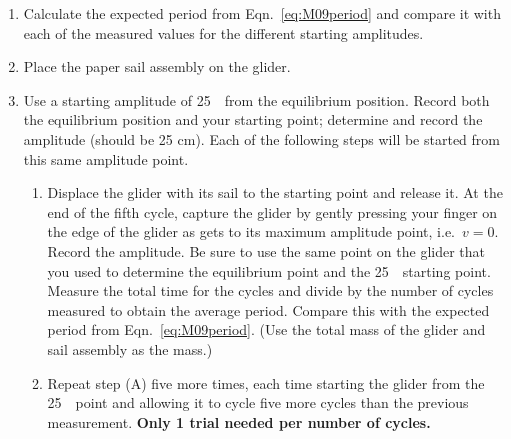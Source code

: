 \begin{itemize}
\begin{enumerate}
  \item Calculate the expected period from Eqn.~\ref{eq:M09period} and compare it with each of the measured values for the different starting amplitudes.
  \item Place the paper sail assembly on the glider.
  \item Use a starting amplitude of 25~\centi\metre\ from the equilibrium position.  Record both the equilibrium position and your starting point; determine and record the amplitude (should be 25 cm).  Each of the following steps will be started from this same amplitude point.
    \begin{enumerate}%
    \item Displace the glider with its sail to the starting point and release it.  At the end of the fifth cycle, capture the glider by gently pressing your finger on the edge of the glider as gets to its maximum amplitude point, i.e.\ $v = 0$.  Record the amplitude.  Be sure to use the same point on the glider that you used to determine the equilibrium point and the 25~\centi\metre\ starting point.  Measure the total time for the cycles and divide by the number of cycles measured to obtain the average period.  Compare this with the expected period from Eqn.~\ref{eq:M09period}.  (Use the total mass of the glider and sail assembly as the mass.)
    \item Repeat step (A) five more times, each time starting the glider from the 25~\centi\metre\ point and allowing it to cycle five more cycles than the previous measurement. \textbf{Only 1 trial needed per number of cycles.}
    \end{enumerate}
  \end{enumerate}
\end{itemize}


